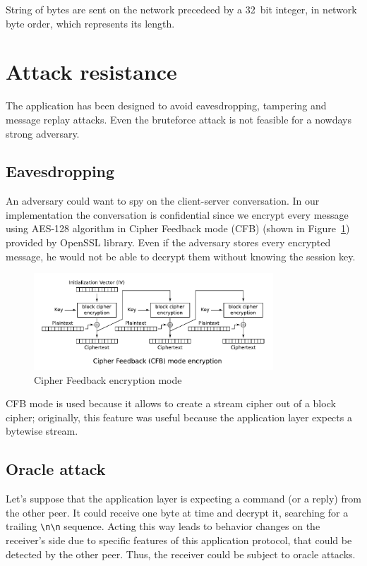 \documentclass[a4paper,12pt]{article}
\begin{document}
String of bytes are sent on the network precedeed by a 32~bit integer, in network byte order, which represents its length.

\section{Attack resistance}

The application has been designed to avoid eavesdropping, tampering and message replay attacks. Even the bruteforce attack is not feasible for a nowdays strong adversary.

\subsection{Eavesdropping}
An adversary could want to spy on the client-server conversation. In our implementation the conversation is confidential since we encrypt every message using AES-128 algorithm in Cipher Feedback mode (CFB) (shown in Figure~\ref{img:cfb-enc-mode}) provided by OpenSSL library.
Even if the adversary stores every encrypted message, he would not be able to decrypt them without knowing the session key.

\begin{figure}[H]
\centering
\includegraphics[width=0.8\textwidth]{img/cfb.pdf}
\caption{Cipher Feedback encryption mode}
\label{img:cfb-enc-mode}
\end{figure}

CFB mode is used because it allows to create a stream cipher out of a block cipher;
originally, this feature was useful because the application layer expects a bytewise stream.

\subsection{Oracle attack}
Let's suppose that the application layer is expecting a command (or a reply) from the other peer.
It could receive one byte at time and decrypt it, searching for a trailing \verb+\n\n+ sequence.
Acting this way leads to behavior changes on the receiver's side due to specific features of this application protocol, that could be detected by the other peer.
Thus, the receiver could be subject to oracle attacks.
\end{document}

